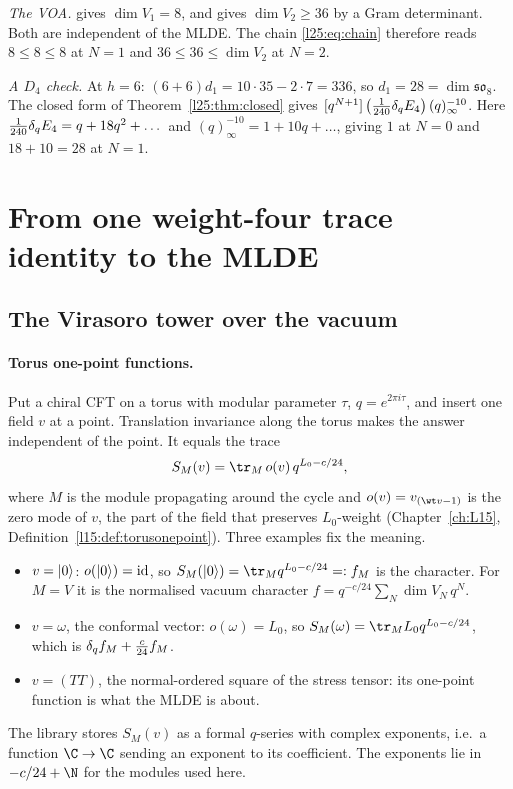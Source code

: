 \begin{example}
\emph{The VOA.}  gives $\dim V_1=8$, and  gives
$\dim V_2\ge36$ by a Gram determinant. Both are independent of the MLDE. The chain \eqref{l25:eq:chain} therefore
reads $8\le8\le8$ at $N=1$ and $36\le36\le\dim V_2$ at $N=2$.

\emph{A $D_4$ check.} At $h=6$: $(6+6)d_1=10\cdot35-2\cdot7=336$, so $d_1=28=\dim\mathfrak{so}_8$. The closed form of
Theorem~\ref{l25:thm:closed} gives $[q^{N+1}]\,\big(\tfrac1{240}\delta_q E_4\big)\,(q)_\infty^{-10}$. Here
$\frac1{240}\delta_q E_4=q+18q^2+\dots$ and $(q)_\infty^{-10}=1+10q+\dots$, giving $1$ at $N=0$ and $18+10=28$ at $N=1$.
\end{example}

\section{From one weight-four trace identity to the MLDE}\label{l25:sec:block}

\subsection{The Virasoro tower over the vacuum}

\paragraph{Torus one-point functions.} Put a chiral CFT on a torus with modular parameter $\tau$, $q=e^{2\pi i\tau}$,
and insert one field $v$ at a point. Translation invariance along the torus makes the answer independent of the point.
It equals the trace
\begin{equation*}
S_M(v)=\tr_M\,o(v)\,q^{L_0-c/24},
\end{equation*}
where $M$ is the module propagating around the cycle and $o(v)=v_{(\wt v-1)}$ is the zero mode of $v$, the part of the
field that preserves $L_0$-weight (Chapter~\ref{ch:L15}, Definition~\ref{l15:def:torusonepoint}). Three examples fix
the meaning.
\begin{itemize}
\item $v=|0\rangle$: $o(|0\rangle)=\mathrm{id}$, so $S_M(\ltwentyfivevac)=\tr_Mq^{L_0-c/24}=:f_M$ is the
  character. For $M=V$ it is the normalised vacuum character $f=q^{-c/24}\sum_N\dim V_N\,q^N$.
\item $v=\omega$, the conformal vector: $o(\omega)=L_0$, so $S_M(\omega)=\tr_ML_0q^{L_0-c/24}$, which is
  $\delta_q f_M+\frac c{24}f_M$.
\item $v=(TT)$, the normal-ordered square of the stress tensor: its one-point function is what the MLDE is about.
\end{itemize}
The library stores $S_M(v)$ as a formal $q$-series with complex exponents, i.e.\ a function $\C\to\C$ sending an
exponent to its coefficient. The exponents lie in $-c/24+\N$ for the modules used here.

